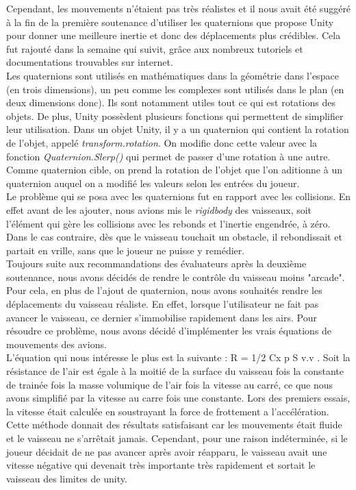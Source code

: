 \documentclass[12pt, titlepage]{article}
\begin{document}
\begin{spacing}{1.5}
Cependant, les mouvements n'étaient pas très réalistes et il nous avait été suggéré à la fin de la première soutenance d'utiliser les quaternions que propose Unity pour donner une meilleure inertie et donc des déplacements plus crédibles. Cela fut rajouté dans la semaine qui suivit, grâce aux nombreux tutoriels et documentations trouvables sur internet.\\

Les quaternions sont utilisés en mathématiques dans la géométrie dans l'espace (en trois dimensions), un peu comme les complexes sont utilisés dans le plan (en deux dimensions donc). Ils sont notamment utiles tout ce qui est rotations des objets. De plus, Unity possèdent plusieurs fonctions qui permettent de simplifier leur utilisation. Dans un objet Unity, il y a un quaternion qui contient la rotation de l'objet, appelé \textit{transform.rotation}. On modifie donc cette valeur avec la fonction \textit{Quaternion.Slerp()} qui permet de passer d'une rotation à une autre. Comme quaternion cible, on prend la rotation de l'objet que l'on aditionne à un quaternion auquel on a modifié les valeurs selon les entrées du joueur.\\

Le problème qui se posa avec les quaternions fut en rapport avec les collisions. En effet avant de les ajouter, nous avions mis le \textit{rigidbody} des vaisseaux, soit l'élément qui gère les collisions avec les rebonds et l'inertie engendrée, à zéro. Dans le cas contraire, dès que le vaisseau touchait un obstacle, il rebondissait et partait en vrille, sans que le joueur ne puisse y remédier.\\

Toujours suite aux recommandations des évaluateurs après la deuxième soutenance, nous avons décidés de rendre le contrôle du vaisseau moins "arcade". Pour cela, en plus de l'ajout de quaternion, nous avons souhaités rendre les déplacements du vaisseau réaliste. En effet, lorsque l'utilisateur ne fait pas avancer le vaisseau, ce dernier s'immobilise rapidement dans les airs. Pour résoudre ce problème, nous avons décidé d'implémenter les vrais équations de mouvements des avions.\\

L'équation qui nous intéresse le plus est la suivante : R = 1/2 Cx p S v.v . Soit la résistance de l'air est égale à la moitié de la surface du vaisseau fois la constante de trainée fois la masse volumique de l'air fois la vitesse au carré, ce que nous avons simplifié par la vitesse au carre fois une constante. Lors des premiers essais, la vitesse était calculée en soustrayant la force de frottement a l'accélération. Cette méthode donnait des résultats satisfaisant car les mouvements était fluide et le vaisseau ne s'arrêtait jamais. Cependant, pour une raison indéterminée, si le joueur décidait de ne pas avancer après avoir réapparu, le vaisseau avait une vitesse négative qui devenait très importante très rapidement et sortait le vaisseau des limites de unity. \\


\end{spacing}
\end{document}

